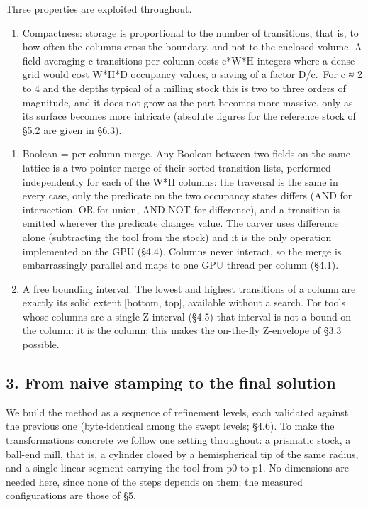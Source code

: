 \documentclass[
]{article}
\providecommand{\tightlist}{%
  \setlength{\itemsep}{0pt}\setlength{\parskip}{0pt}}
\begin{document}
Three properties are exploited throughout.

\begin{enumerate}
\def\labelenumi{\arabic{enumi}.}
\tightlist
\item
  Compactness: storage is proportional to the number of transitions,
  that is, to how often the columns cross the boundary, and not to the
  enclosed volume. A field averaging c transitions per column costs
  c*W*H integers where a dense grid would cost W*H*D occupancy values, a
  saving of a factor D/c.~For c ≈ 2 to 4 and the depths typical of a
  milling stock this is two to three orders of magnitude, and it does
  not grow as the part becomes more massive, only as its surface becomes
  more intricate (absolute figures for the reference stock of §5.2 are
  given in §6.3).
\end{enumerate}

\begin{enumerate}
\def\labelenumi{\arabic{enumi}.}
\tightlist
\item
  Boolean = per-column merge. Any Boolean between two fields on the same
  lattice is a two-pointer merge of their sorted transition lists,
  performed independently for each of the W*H columns: the traversal is
  the same in every case, only the predicate on the two occupancy states
  differs (AND for intersection, OR for union, AND-NOT for difference),
  and a transition is emitted wherever the predicate changes value. The
  carver uses difference alone (subtracting the tool from the stock) and
  it is the only operation implemented on the GPU (§4.4). Columns never
  interact, so the merge is embarrassingly parallel and maps to one GPU
  thread per column (§4.1).
\item
  A free bounding interval. The lowest and highest transitions of a
  column are exactly its solid extent {[}bottom, top{]}, available
  without a search. For tools whose columns are a single Z-interval
  (§4.5) that interval is not a bound on the column: it is the column;
  this makes the on-the-fly Z-envelope of §3.3 possible.
\end{enumerate}

\hypertarget{from-naive-stamping-to-the-final-solution}{%
\subsection{3. From naive stamping to the final
solution}\label{from-naive-stamping-to-the-final-solution}}

We build the method as a sequence of refinement levels, each validated
against the previous one (byte-identical among the swept levels; §4.6).
To make the transformations concrete we follow one setting throughout: a
prismatic stock, a ball-end mill, that is, a cylinder closed by a
hemispherical tip of the same radius, and a single linear segment
carrying the tool from p0 to p1. No dimensions are needed here, since
none of the steps depends on them; the measured configurations are those
of §5.
\end{document}
